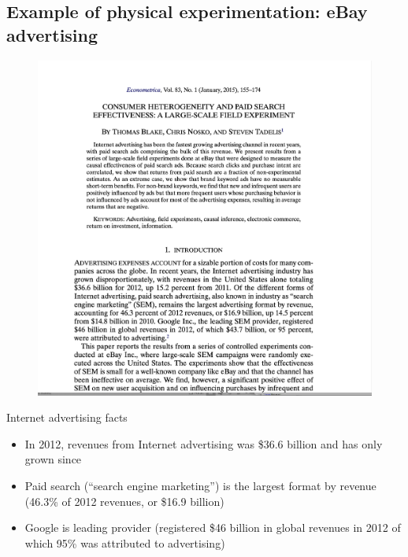 \documentclass{beamer}
\begin{document}
\subsection{Example of physical experimentation: eBay advertising}

\begin{frame}

\begin{figure}[hpt]
\begin{center}
\includegraphics[scale=0.25]{./lecture_includes/econometrica_steve.png}
\end{center}
\end{figure}

\end{frame}

\begin{frame}{Internet advertising facts}

\begin{itemize}
\item In 2012, revenues from Internet advertising was \$36.6 billion and has only grown since
\item Paid search (``search engine marketing'') is the largest format by revenue (46.3\% of 2012 revenues, or \$16.9 billion)
\item Google is leading provider (registered \$46 billion in global revenues in 2012 of which 95\% was attributed to advertising)
\end{itemize}

\end{frame}
\end{document}
